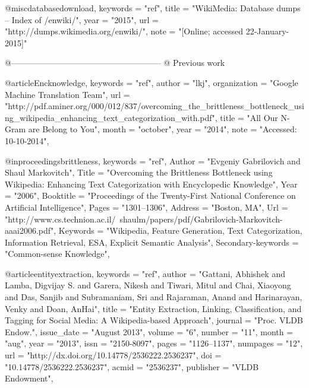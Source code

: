 @misc{databasedownload,
    keywords    =   "ref",
    title       =   "WikiMedia: Database dumps -- Index of /enwiki/",
    year        =   "2015",
    url         =   "http://dumps.wikimedia.org/enwiki/",
    note        =   "[Online; accessed 22-January-2015]"
}
 

 
@------------------------------------------------------
@ Previous work

@article{Encknowledge,
    keywords    =   "ref",
    author      =   "lkj",
    organization =  "Google Machine Translation Team",
    url         =   "http://pdf.aminer.org/000/012/837/overcoming_the_brittleness_bottleneck_using_wikipedia_enhancing_text_categorization_with.pdf",
    title       =   "All Our N-Gram are Belong to You",
    month       =   "october",
    year        =   "2014",
    note        =   "Accessed: 10-10-2014",
}

@inproceedings{brittleness,
    keywords    =   "ref",
    Author      =   "Evgeniy Gabrilovich and Shaul Markovitch",
    Title       =   "Overcoming the Brittleness Bottleneck using Wikipedia: Enhancing Text Categorization with Encyclopedic Knowledge",
    Year        =   "2006",
    Booktitle   =   "Proceedings of the Twenty-First National Conference on Artificial Intelligence",
    Pages       =   "1301--1306",
    Address     =   "Boston, MA",
    Url         =   "http://www.cs.technion.ac.il/~shaulm/papers/pdf/Gabrilovich-Markovitch-aaai2006.pdf",
    Keywords    =   "Wikipedia, Feature Generation, Text Categorization, Information Retrieval, ESA, Explicit Semantic Analysis",
    Secondary-keywords = "Common-sense Knowledge",
}

@article{entityextraction,
    keywords    =   "ref",
    author      =   "Gattani, Abhishek and Lamba, Digvijay S. and Garera, Nikesh and Tiwari, Mitul and Chai, Xiaoyong and Das, Sanjib and Subramaniam, Sri and Rajaraman, Anand and Harinarayan, Venky and Doan, AnHai",
    title       =   "Entity Extraction, Linking, Classification, and Tagging for Social Media: A Wikipedia-based Approach",
    journal     =   "Proc. VLDB Endow.",
    issue_date  =   "August 2013",
    volume      =   "6",
    number      =   "11",
    month       =   "aug",
    year        =   "2013",
    issn        =   "2150-8097",
    pages       =   "1126--1137",
    numpages    =   "12",
    url         =   "http://dx.doi.org/10.14778/2536222.2536237",
    doi         =   "10.14778/2536222.2536237",
    acmid       =   "2536237",
    publisher   =   "VLDB Endowment",
} 




